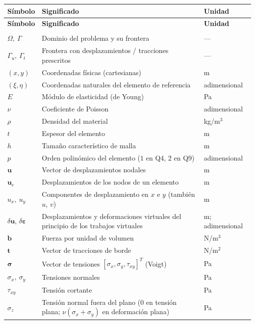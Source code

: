 \renewcommand{\arraystretch}{1.2}
\begin{longtable}{@{}>{\raggedright\arraybackslash}p{3.0cm}p{7.8cm}p{3.0cm}@{}}
\toprule
\textbf{Símbolo} & \textbf{Significado} & \textbf{Unidad} \\
\midrule
\endfirsthead
\toprule
\textbf{Símbolo} & \textbf{Significado} & \textbf{Unidad} \\
\midrule
\endhead
\bottomrule
\endfoot
\multicolumn{3}{@{}l}{\textit{Dominio, material y campos}} \\
\addlinespace
$\Omega,\ \Gamma$ & Dominio del problema y su frontera & --- \\
$\Gamma_u,\ \Gamma_t$ & Frontera con desplazamientos / tracciones prescritos & --- \\
$(x,y)$ & Coordenadas físicas (cartesianas) & m \\
$(\xi,\eta)$ & Coordenadas naturales del elemento de referencia & adimensional \\
$E$ & Módulo de elasticidad (de Young) & Pa \\
$\nu$ & Coeficiente de Poisson & adimensional \\
$\rho$ & Densidad del material & kg/m$^3$ \\
$t$ & Espesor del elemento & m \\
$h$ & Tamaño característico de malla & m \\
$p$ & Orden polinómico del elemento ($1$ en Q4, $2$ en Q9) & adimensional \\
$\bm{u}$ & Vector de desplazamientos nodales & m \\
$\bm{u}_e$ & Desplazamientos de los nodos de un elemento & m \\
$u_x,\ u_y$ & Componentes de desplazamiento en $x$ e $y$ (también $u$, $v$) & m \\
$\delta\bm{u}$, $\delta\bm{\varepsilon}$ & Desplazamientos y deformaciones virtuales del principio de los trabajos virtuales & m; adimensional \\
$\bm{b}$ & Fuerza por unidad de volumen & N/m$^3$ \\
$\bm{t}$ & Vector de tracciones de borde & N/m$^2$ \\
$\bm{\sigma}$ & Vector de tensiones $[\sigma_x,\sigma_y,\tau_{xy}]^T$ (Voigt) & Pa \\
$\sigma_x,\ \sigma_y$ & Tensiones normales & Pa \\
$\tau_{xy}$ & Tensión cortante & Pa \\
$\sigma_z$ & Tensión normal fuera del plano ($0$ en tensión plana; $\nu(\sigma_x+\sigma_y)$ en deformación plana) & Pa \\

\end{longtable}
